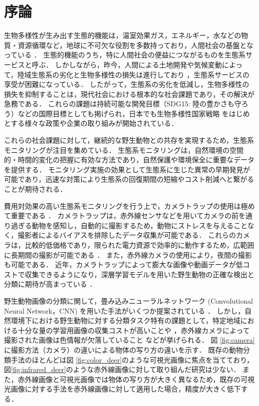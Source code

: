 \documentclass[a4paper,11pt,nomag]{jsreport}
\begin{document}
\chapter*{序論}

生物多様性が生み出す生態的機能は，温室効果ガス，エネルギー，水などの物質・資源循環など，地球に不可欠な役割を多数持っており，人間社会の基盤となっている \cite{millennium-ecosystem2005,cardinale2011}．
生態的機能のうち，特に人間社会の便益につながるものを生態系サービスと呼ぶ．
しかしながら，昨今，人間による土地開発や気候変動によって，陸域生態系の劣化と生物多様性の損失は進行しており \cite{newbold2015,isbell2017}，生態系サービスの享受が困難になっている．
したがって，生態系の劣化を低減し，生物多様性の損失を抑制することは，現代社会における根本的な社会課題であり，その解決が急務である．
これらの課題は持続可能な開発目標（SDG15: 陸の豊かさも守ろう）などの国際目標としても掲げられ，日本でも生物多様性国家戦略 \cite{biodiversity2023}をはじめとする様々な政策や企業の取り組みが開始されている．

これらの社会課題に対して，継続的な野生動物との共存を実現するため，生態系モニタリングが注目を集めている．
生態系モニタリングは，自然環境の空間的・時間的変化の把握に有効な方法であり，自然保護や環境保全に重要なデータを提供する．
モニタリング実施の効果として生態系に生じた異常の早期発見が可能であり，迅速な対策により生態系の回復期間の短縮やコスト削減へと繋がることが期待される．

費用対効果の高い生態系モニタリングを行う上で，カメラトラップの使用は極めて重要である \cite{jia2022}．
カメラトラップは，赤外線センサなどを用いてカメラの前を通り過ぎる動物を感知し，自動的に撮影するため，動物にストレスを与えることなく，撮影者によるバイアスを排除したデータ収集が可能である\cite{newey2015,zhu2017}．
これらのカメラは，比較的低価格であり，限られた電力資源で効率的に動作するため，広範囲に長期間の撮影が可能である \cite{schneider2018, carl2020}．
また，赤外線カメラの使用により，夜間の撮影も可能である．
近年，カメラトラップによって膨大な画像や動画データが低コストで収集できるようになり，深層学習モデルを用いた野生動物の正確な検出と分類に期待が高まっている \cite{tan2022}．

野生動物画像の分類に関して，畳み込みニューラルネットワーク (Convolutional Neural Network，CNN) を用いた手法がいくつか提案されている \cite{manna2023,mohanty2022, agarwal2023, neeli2023}．
しかし，自然環境下における野生動物に対する分類タスク特有の課題として，特定地域における十分な量の学習用画像の収集コストが高いことや \cite{schneider2020}，赤外線カメラによって撮影された画像は色情報が欠落していること \cite{kishimoto2023}などが挙げられる．
図 \ref{fig:camera}に撮影方法（カメラ）の違いによる物体の写り方の違いを示す．
既存の動物分類手法のほとんどは図 \ref{fig:color_deer}のような可視光画像に焦点を当てており，図\ref{fig:infrared_deer}のような赤外線画像に対して取り組んだ研究は少ない．
また，赤外線画像と可視光画像では物体の写り方が大きく異なるため，既存の可視光画像に対する手法を赤外線画像に対して適用した場合，精度が大きく低下する．
\end{document}
